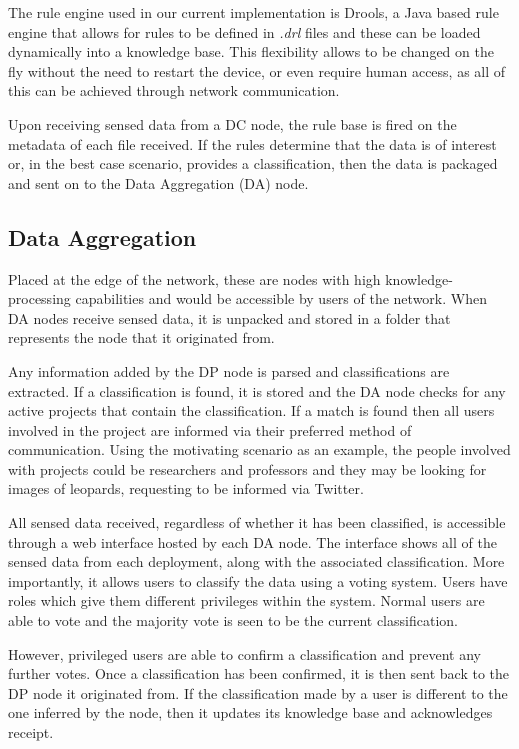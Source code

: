 	The rule engine used in our current implementation is Drools, a Java based rule engine that allows for rules to be defined in \textit{.drl} files and these can be loaded dynamically into a knowledge base. This flexibility allows to be changed on the fly without the need to restart the device, or even require human access, as all of this can be achieved through network communication. 
	
	Upon receiving sensed data from a DC node, the rule base is fired on the metadata of each file received. If the rules determine that the data is of interest or, in the best case scenario, provides a classification, then the data is packaged and sent on to the Data Aggregation (DA) node.
	
	\subsection{Data Aggregation}
	Placed at the edge of the network, these are nodes with high knowledge-processing capabilities and would be accessible by users of the network. When DA nodes receive sensed data, it is unpacked and stored in a folder that represents the node that it originated from. 
	
	Any information added by the DP node is parsed and classifications are extracted. If a classification is found, it is stored and the DA node checks for any active projects that contain the classification. If a match is found then all users involved in the project are informed via their preferred method of communication. Using the motivating scenario as an example, the people involved with projects could be researchers and professors and they may be looking for images of leopards, requesting to be informed via Twitter.
	
	All sensed data received, regardless of whether it has been classified, is accessible through a web interface hosted by each DA node. The interface shows all of the sensed data from each deployment, along with the associated classification. More importantly, it allows users to classify the data using a voting system. Users have roles which give them different privileges within the system. Normal users are able to vote and the majority vote is seen to be the current classification.
	
	However, privileged users are able to confirm a classification and prevent any further votes. Once a classification has been confirmed, it is then sent back to the DP node it originated from. If the classification made by a user is different to the one inferred by the node, then it updates its knowledge base and acknowledges receipt.
	
